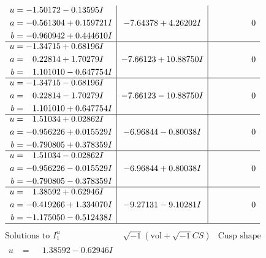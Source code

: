 \documentclass[1p]{elsarticle_modified}
\theoremstyle{definition}
\newcommand{\I}{\sqrt{-1}}
\begin{document}
$$\begin{array}{c|c|c}
\begin{aligned}
u &= -1.50172 - 0.13595 I \\
a &= -0.561304 + 0.159721 I \\
b &= -0.960942 + 0.444610 I\end{aligned}
 & -7.64378 + 4.26202 I & \phantom{-0.000000 } 0 \\ \hline\begin{aligned}
u &= -1.34715 + 0.68196 I \\
a &= \phantom{-}0.22814 + 1.70279 I \\
b &= \phantom{-}1.101010 - 0.647754 I\end{aligned}
 & -7.66123 + 10.88750 I & \phantom{-0.000000 } 0 \\ \hline\begin{aligned}
u &= -1.34715 - 0.68196 I \\
a &= \phantom{-}0.22814 - 1.70279 I \\
b &= \phantom{-}1.101010 + 0.647754 I\end{aligned}
 & -7.66123 - 10.88750 I & \phantom{-0.000000 } 0 \\ \hline\begin{aligned}
u &= \phantom{-}1.51034 + 0.02862 I \\
a &= -0.956226 + 0.015529 I \\
b &= -0.790805 + 0.378359 I\end{aligned}
 & -6.96844 - 0.80038 I & \phantom{-0.000000 } 0 \\ \hline\begin{aligned}
u &= \phantom{-}1.51034 - 0.02862 I \\
a &= -0.956226 - 0.015529 I \\
b &= -0.790805 - 0.378359 I\end{aligned}
 & -6.96844 + 0.80038 I & \phantom{-0.000000 } 0 \\ \hline\begin{aligned}
u &= \phantom{-}1.38592 + 0.62946 I \\
a &= -0.419266 + 1.334070 I \\
b &= -1.175050 - 0.512438 I\end{aligned}
 & -9.27131 - 9.10281 I & \phantom{-0.000000 } 0\\
 \hline 
 \end{array}$$\newpage$$\begin{array}{c|c|c}  
\text{Solutions to }I^u_{1}& \I (\text{vol} + \sqrt{-1}CS) & \text{Cusp shape}\\
 \hline 
\begin{aligned}
u &= \phantom{-}1.38592 - 0.62946 I \\

\end{aligned}
\end{array}$$
\end{document}
